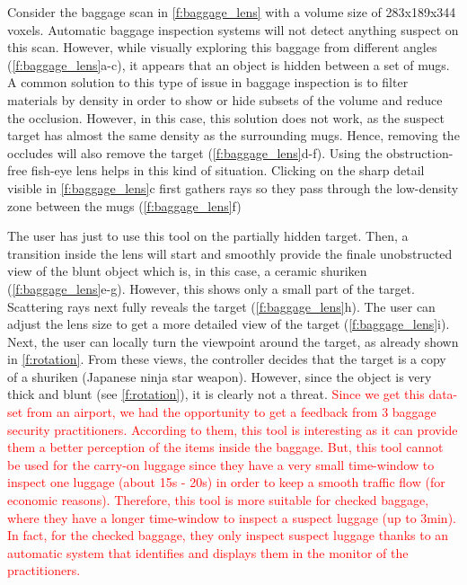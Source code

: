 Consider the baggage scan in \autoref{f:baggage_lens} with a volume size of 283x189x344 voxels. Automatic baggage inspection systems will not detect anything suspect on this scan. However, while visually exploring this baggage from different angles (\autoref{f:baggage_lens}a-c), it appears that an object is hidden between a set of mugs. A common solution to this type of issue in baggage inspection is to filter materials by density in order to show or hide subsets of the volume and reduce the occlusion. However, in this case, this solution does not work, as the suspect target has almost the same density as the surrounding mugs. Hence, removing the occludes will also remove the target (\autoref{f:baggage_lens}d-f). Using the obstruction-free fish-eye lens helps in this kind of situation. Clicking on the sharp detail visible in \autoref{f:baggage_lens}c first gathers rays so they pass through the low-density zone between the mugs (\autoref{f:baggage_lens}f)

The user has just to use this tool on the partially hidden target. Then, a transition inside the lens will start and smoothly provide the finale unobstructed view of the blunt object which is, in this case, a ceramic shuriken (\autoref{f:baggage_lens}e-g). However, this shows only a small part of the target. Scattering rays next fully reveals the target (\autoref{f:baggage_lens}h). The user can adjust the lens size to get a more detailed view of the target (\autoref{f:baggage_lens}i). Next, the user can locally turn the viewpoint around the target, as already shown in \autoref{f:rotation}. From these views, the controller decides that the target is a copy of a shuriken (Japanese ninja star weapon). However, since the object is very thick and blunt (see \autoref{f:rotation}), it is clearly not a threat.
\textcolor{red}{
Since we get this data-set from an airport, we had the opportunity to get a feedback from 3 baggage security practitioners. According to them, this tool is interesting as it can provide them a better perception of the items inside the baggage. But, this tool cannot be used for the carry-on luggage since they have a very small time-window to inspect one luggage (about 15s - 20s) in order to keep a smooth traffic flow (for economic reasons). Therefore, this tool is more suitable for checked baggage, where they have a longer time-window to inspect a suspect luggage (up to 3min). In fact, for the checked baggage, they only inspect suspect luggage thanks to an automatic system that identifies and displays them in the monitor of the practitioners. }

